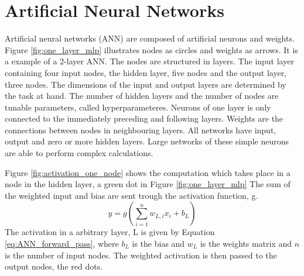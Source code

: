 \documentclass{article}
\begin{document}
\section{Artificial Neural Networks} \label{sec:artificial neural networks}

Artificial neural networks (ANN) are composed of artificial neurons and weights. Figure \ref{fig:one_layer_mlp} illustrates nodes as circles and weights as arrows. It is a example of a 2-layer ANN. The nodes are structured in layers. The input layer containing four input nodes, the hidden layer, five nodes and the output layer, three nodes. The dimensions of the input and output layers are determined by the task at hand. The number of hidden layers and the number of nodes are tunable parameters, called hyperparameteres. Neurons of one layer is only connected to the immediately preceding and following layers. Weights are the connections between nodes in neighbouring layers. All networks have input, output and zero or more hidden layers. Large networks of these simple neurons are able to perform complex calculations. 

Figure \ref{fig:activation_one_node} shows the computation which takes place in a node in the hidden layer, a green dot in Figure \ref{fig:one_layer_mlp} The sum of the weighted input and bias are sent trough the activation function, g. 
\begin{equation} \label{eq:ANN_forward_pass}
    y = g(\sum_{i=1}^n w_{L, i} x_i + b_L)
\end{equation}
The activation in a arbitrary layer, L is given by Equation \eqref{eq:ANN_forward_pass}, where $b_L$ is the bias and $w_L$ is the weights matrix and $n$ is the number of input nodes. The weighted activation is then passed to the output nodes, the red dots. 
\end{document}
